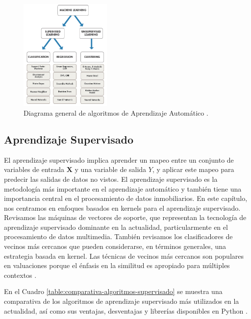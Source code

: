 \begin{figure}[!htbp]
  \centering
  \includegraphics[width=0.4\textwidth]{imagenes/02-marco-teorico/machinelearningtypes.jpg}
  \caption[Diagrama de Aprendizaje Automático]{Diagrama general de algoritmos de Aprendizaje Automático \cite{mathworks_machine_learning}.}
  \label{fig:aprendizaje}
\end{figure}


\subsection{Aprendizaje Supervisado}
El aprendizaje supervisado implica aprender un mapeo entre un conjunto de
variables de entrada \( \mathbf{X} \) y una variable de salida \( Y \), y
aplicar este mapeo para predecir las salidas de datos no vistos. El aprendizaje
supervisado es la metodología más importante en el aprendizaje automático y
también tiene una importancia central en el procesamiento de datos inmobiliarios.
En este capítulo, nos centramos en enfoques basados en kernels para el
aprendizaje supervisado. Revisamos las máquinas de vectores de soporte,
que representan la tecnología de aprendizaje supervisado dominante en la
actualidad, particularmente en el procesamiento de datos multimedia. También
revisamos los clasificadores de vecinos más cercanos que pueden considerarse,
en términos generales, una estrategia basada en kernel. Las técnicas de vecinos
más cercanos son populares en valuaciones porque el énfasis en la similitud es
apropiado para múltiples contextos \cite{Cunningham2008}.

En el Cuadro \ref{table:comparativa-algoritmos-supervisado} se muestra una
comparativa de los algoritmos de aprendizaje supervisado más utilizados en la
actualidad, así como sus ventajas, desventajas y librerías disponibles en Python
\cite{10.1145/1143844.1143865}.


